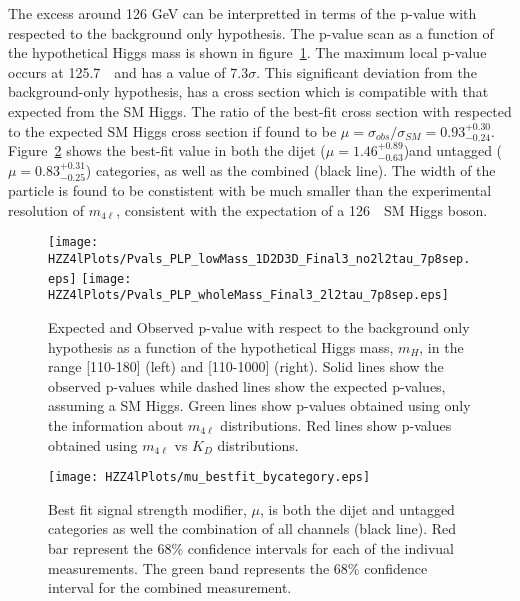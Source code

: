 The excess around 126 GeV can be interpretted in terms of the 
p-value with respected to the background only hypothesis.  
The p-value scan as a function of the hypothetical Higgs mass
is shown in figure~\ref{fig:HZZ4lPvalues}.  The maximum local 
p-value 
occurs at 125.7~\GeV~and has a value of $7.3\sigma$.  This 
significant deviation from the background-only hypothesis, has 
a cross section which is compatible 
with that expected from the SM Higgs.  The ratio of the best-fit
cross section with respected to the expected SM Higgs cross
section if found to be $\mu=\sigma_{obs}/\sigma_{SM}=0.93^{+0.30}_{-0.24}$.  Figure~\ref{fig:HZZ4lfittedMu} shows the best-fit value
in both the dijet ($\mu=1.46^{+0.89}_{-0.63}$)and untagged ($\mu=0.83^{+0.31}_{-0.25}$) categories, as well as the combined
(black line).  The width of the particle is found to be 
constistent with be much smaller than the experimental resolution
of $m_{4\ell}$, consistent with the expectation of a 126~\GeV~SM 
Higgs boson.

\begin{figure}
\begin{center}
\texttt{[image: HZZ4lPlots/Pvals\_PLP\_lowMass\_1D2D3D\_Final3\_no2l2tau\_7p8sep.eps]}
\texttt{[image: HZZ4lPlots/Pvals\_PLP\_wholeMass\_Final3\_2l2tau\_7p8sep.eps]}
\caption{Expected and Observed p-value with respect to the
background only hypothesis as a function of the hypothetical 
Higgs mass, $m_H$, in the range [110-180] (left) and 
[110-1000] (right).  Solid lines show the observed p-values
while dashed lines show the expected p-values, assuming a 
SM Higgs.  Green lines show p-values obtained using only
the information about $m_{4\ell}$ distributions. Red
lines show p-values obtained using $m_{4\ell}$ vs $K_D$
distributions. }
\label{fig:HZZ4lPvalues}
\end{center}
\end{figure}

\begin{figure}
\begin{center}
\texttt{[image: HZZ4lPlots/mu\_bestfit\_bycategory.eps]}
\caption{Best fit signal strength modifier, $\mu$, is both the 
dijet and untagged categories as well the combination of all 
channels (black line).  Red bar represent the 68\% confidence 
intervals for each of the indivual measurements.  The 
green band represents the 68\% confidence interval for the
combined measurement.}
\label{fig:HZZ4lfittedMu}
\end{center}
\end{figure}



